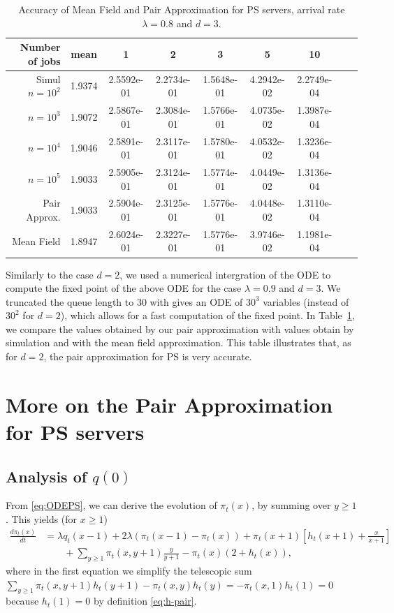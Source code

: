 \documentclass[acmsmall,nonacm]{acmart}
\begin{document}
\begin{table}[t]
    \centering
    \begin{tabular}{|r|c|c|c|c|c|c|c|c|}
    \hline 
        Number of jobs & mean & 1 & 2 & 3 & 5 & 10\\ \hline
         \hline
Simul $n=10^2$&          1.9374&   2.5592e-01  & 2.2734e-01 &  1.5648e-01 &  4.2942e-02 &  2.2749e-04\\
$n=10^3$&1.9072  & 2.5867e-01  & 2.3084e-01   &1.5766e-01  & 4.0735e-02  & 1.3987e-04\\
 $n=10^4$&   1.9046 &  2.5891e-01 &  2.3117e-01   &1.5780e-01&   4.0532e-02  & 1.3236e-04\\
  $n=10^5$&  1.9033  & 2.5905e-01 &  2.3124e-01   &1.5774e-01&   4.0449e-02  & 1.3136e-04\\ \hline
  Pair Approx. & 1.9033 &  2.5904e-01 &  2.3125e-01 &  1.5776e-01 &  4.0448e-02 &  1.3110e-04 \\ \hline
 Mean Field &  1.8947  & 2.6024e-01  & 2.3227e-01   &1.5776e-01  & 3.9746e-02 &  1.1981e-04\\
           \hline
    \end{tabular}
    \caption{Accuracy of Mean Field and Pair Approximation for PS servers, arrival rate $\lambda=0.8$ and $d=3$. }
    \label{tab:simulPAIR08PSd3}
\end{table}

Similarly to the case $d=2$, we used a numerical intergration of the ODE to compute the fixed point of the above ODE for the case $\lambda=0.9$ and $d=3$. We truncated the queue length to $30$ with gives an ODE of $30^3$ variables (instead of $30^2$ for $d=2$), which allows for a fast computation of the fixed point. In Table~\ref{tab:simulPAIR08PSd3}, we compare the values obtained by our pair approximation with values obtain by simulation and with the mean field approximation. This table illustrates that, as for $d=2$, the pair approximation for PS is very accurate.

\color{black}

\section{More on the Pair Approximation for PS servers}\label{apx:morePS}
\subsection{Analysis of $q(0)$}

From \eqref{eq:ODEPS}, we can derive the evolution of $\pi_t(x)$, by summing over $y\ge1$. This yields (for $x\ge1$)
\begin{align}\label{eq:sumy}
    \frac{d \pi_t(x)}{dt} &= \lambda q_t(x-1)  + 2\lambda(\pi_t(x-1)-\pi_t(x)) + \pi_t(x+1)\left[h_t(x+1)+\frac{x}{x+1}\right] \nonumber\\
    &\qquad+ \sum_{y\ge1} \pi_t(x,y+1)\frac{y}{y+1} - \pi_t(x)(2+h_t(x)),
\end{align}
where in the first equation we simplify the telescopic sum $\sum_{y\ge1}\pi_t(x,y+1)h_t(y+1) - \pi_t(x,y)h_t(y)=-\pi_t(x,1)h_t(1)=0$ because $h_t(1)=0$ by definition  \eqref{eq:h-pair}. 
\end{document}
